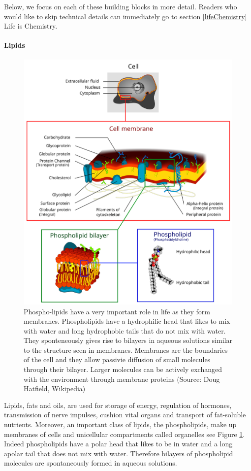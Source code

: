 \documentclass[
  11pt,
]{book}
\begin{document}
Below, we focus on each of these building blocks in more detail. Readers who would like to skip technical details can immediately go to section \ref{lifeChemistry} Life is Chemistry.

\hypertarget{lipids}{%
\paragraph{Lipids}\label{lipids}}

\begin{figure}

{\centering \includegraphics[width=0.8\linewidth]{./figs/Cell_membrane_detailed_diagram_4} 

}

\caption{Phospho-lipids have a very important role in life as they form membranes. Phospholipids have a hydrophilic head that likes to mix with water and long hydrophobic tails that do not mix with water. They sponteneously gives rise to bilayers in aqueous solutions similar to the structure seen in membranes. Membranes are the boundaries of the cell and they allow passivie diffusion of small molecules through their bilayer. Larger molecules can be actively exchanged with the environment through membrane proteins (Source: Doug Hatfield, Wikipedia)}\label{fig:lipids}
\end{figure}

Lipids, fats and oils, are used for storage of energy, regulation of hormones, transmission of nerve impulses, cushion vital organs and transport of fat-soluble nutrients. Moreover, an important class of lipids, the phospholipids, make up membranes of cells and unicellular compartments called organelles see Figure \ref{fig:lipids}. Indeed phospholipids have a polar head that likes to be in water and a long apolar tail that does not mix with water. Therefore bilayers of phospholipid molecules are spontaneously formed in aqueous solutions.
\end{document}

